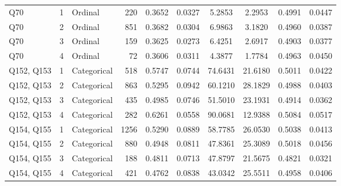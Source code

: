 \begin{longtable}{lllrccccc}
Q70 & 1 & Ordinal & 220 & 0.3652 & 0.0327 & 5.2853 & 2.2953 & 0.4991 & 0.0447 \\
Q70 & 2 & Ordinal & 851 & 0.3682 & 0.0304 & 6.9863 & 3.1820 & 0.4960 & 0.0387 \\
Q70 & 3 & Ordinal & 159 & 0.3625 & 0.0273 & 6.4251 & 2.6917 & 0.4903 & 0.0377 \\
Q70 & 4 & Ordinal & 72 & 0.3606 & 0.0311 & 4.3877 & 1.7784 & 0.4963 & 0.0450 \\
Q152, Q153 & 1 & Categorical & 518 & 0.5747 & 0.0744 & 74.6431 & 21.6180 & 0.5011 & 0.0422 \\
Q152, Q153 & 2 & Categorical & 863 & 0.5295 & 0.0942 & 60.1210 & 28.1829 & 0.4988 & 0.0403 \\
Q152, Q153 & 3 & Categorical & 435 & 0.4985 & 0.0746 & 51.5010 & 23.1931 & 0.4914 & 0.0362 \\
Q152, Q153 & 4 & Categorical & 282 & 0.6261 & 0.0558 & 90.0681 & 12.9388 & 0.5084 & 0.0517 \\
Q154, Q155 & 1 & Categorical & 1256 & 0.5290 & 0.0889 & 58.7785 & 26.0530 & 0.5038 & 0.0413 \\
Q154, Q155 & 2 & Categorical & 880 & 0.4948 & 0.0811 & 47.8361 & 25.3089 & 0.5018 & 0.0456 \\
Q154, Q155 & 3 & Categorical & 188 & 0.4811 & 0.0713 & 47.8797 & 21.5675 & 0.4821 & 0.0321 \\
Q154, Q155 & 4 & Categorical & 421 & 0.4762 & 0.0838 & 43.0342 & 25.5511 & 0.4958 & 0.0406 \\
\end{longtable}
